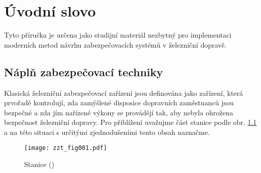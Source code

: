 \chapter{Úvodní slovo}\label{bzt:chapI}
\minitoc

  Tyto příručka je určena jako studijní materiál nezbytný pro implementaci moderních 
  metod návrhu zabezpečovacích systémů v železniční dopravě.
   
\section{Náplň zabezpečovací techniky}
  Klasická železniční zabezpečovací zařízení jsou definována jako zařízení, která prvořadě 
  kontrolují, zda zamýšlené disposice dopravních zaměstnanců jsou bezpečné a zda jím nařízené 
  výkony se provádějí tak, aby nebyla ohrožena bezpečnost železniční dopravy. Pro přiblížení 
  uvažujme část stanice podle obr. \ref{zzt:fig001} a na této situaci s určitými zjednodušeními 
  tento obsah naznačme.

  \begin{figure}[ht!] %
    \centering
    \texttt{[image: zzt\_fig001.pdf]}
    \caption{Stanice
             (\cite[s.~5]{Chudacek2005})}
    \label{zzt:fig001}
  \end{figure}
 
